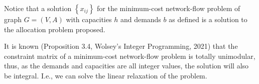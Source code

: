 \documentclass[a4paper]{report}
\begin{document}
Notice that a solution $\left\{ x_{ij} \right\}$ for the minimum-cost network-flow problem of graph $G=\left( V,A \right) $ with capacities $h$ and demands $b$ as defined is a solution to the allocation problem proposed.

It is known (Proposition 3.4, Wolsey's Integer Programming, 2021) that the constraint matrix of a minimum-cost network-flow problem is totally unimodular, thus, as the demands and capacities are all integer values, the solution will also be integral. I.e., we can solve the linear relaxation of the problem.
\end{document}
